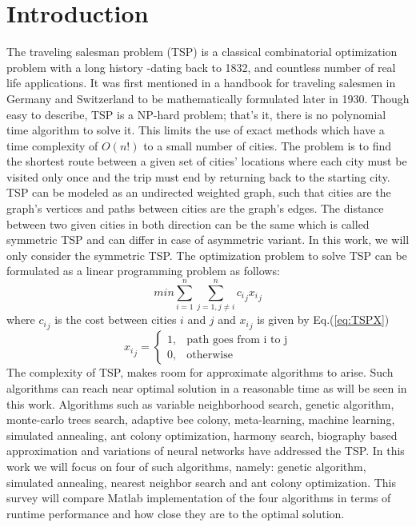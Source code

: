 \documentclass[twocolumn]{article}
\begin{document}
	\section{Introduction}
	The traveling salesman problem (TSP) is a classical combinatorial optimization problem with a long history -dating back to 1832, and countless number of real life applications\cite{applegate07}\cite{punnen07}. It was first mentioned in a handbook for traveling salesmen in Germany and Switzerland to be mathematically formulated later in 1930. Though easy to describe, TSP is a NP-hard problem; that's it, there is no polynomial time algorithm to solve it. This limits the use of exact methods which have a time complexity of $O(n!)$ to a small number of cities.
	The problem is to find the shortest route between a given set of cities' locations where each city must be visited only once and the trip must end by returning back to the starting city. TSP can be modeled as an undirected weighted graph, such that cities are the graph's vertices and paths between cities are the graph's edges. The distance between two given cities in both direction can be the same which is called symmetric TSP and can differ in case of asymmetric variant. In this work, we will only consider the symmetric TSP.
	The optimization problem to solve TSP can be formulated as a linear programming problem as follows\cite{papadimitriou98}:
	\begin{equation} \label{eq:TSPLinearProgramming}
	min \sum_{i=1}^{n} \sum_{j=1, j\neq i}^{n} {c_i}_j {x_i}_j
	\end{equation}
	where ${c_i}_j$ is the cost between cities $i$ and $j$ and ${x_i}_j$ is given by Eq.(\ref{eq:TSPX})
	\begin{equation} \label{eq:TSPX}
	{x_i}_j = 
	\begin{cases}
	1,& \text{path goes from i to j}\\
	0,& \text{otherwise}
	\end{cases}
	\end{equation}
	The complexity of TSP, makes room for approximate algorithms to arise\cite{Brucal17}. Such algorithms can reach near optimal solution in a reasonable time as will be seen in this work. Algorithms such as variable neighborhood search\cite{Thanh15}, genetic algorithm\cite{Wang17}, monte-carlo trees search\cite{Perez14}, adaptive bee colony\cite{Rekaby13}, meta-learning\cite{Kanda11}, machine learning\cite{Pihera14}, simulated annealing\cite{Kerrache14}, ant colony optimization\cite{Swiatnicki15}, harmony search\cite{Tongchan17}, biography based approximation\cite{Wu17} and variations of neural networks\cite{Gao10}\cite{Mueller15} have addressed the TSP. In this work we will focus on four of such algorithms, namely: genetic algorithm\cite{Kirk14}\cite{mathwork}, simulated annealing\cite{Jang02}, nearest neighbor search\cite{Jevtic14} and ant colony optimization\cite{Ibrahim15}. This survey will compare {Matlab\texttrademark}  implementation of the four algorithms in terms of runtime performance and how close they are to the optimal solution.
	
\end{document}
